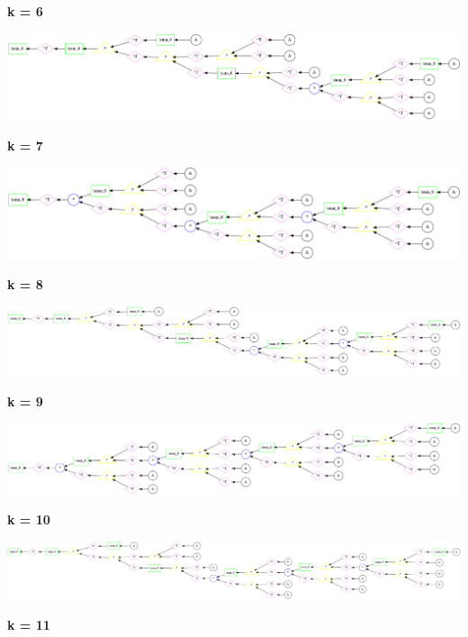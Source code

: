 {\bf k = 6}


\begin{center}
\includegraphics[width=0.45\linewidth]{trees/SumAmultA_6_horizontal_0.png}
\end{center}


{\bf k = 7}


\begin{center}
\includegraphics[width=0.45\linewidth]{trees/SumAmultA_7_horizontal_0.png}
\end{center}


{\bf k = 8}


\begin{center}
\includegraphics[width=0.45\linewidth]{trees/SumAmultA_8_horizontal_0.png}
\end{center}


{\bf k = 9}


\begin{center}
\includegraphics[width=0.45\linewidth]{trees/SumAmultA_9_horizontal_0.png}
\end{center}


{\bf k = 10}


\begin{center}
\includegraphics[width=0.45\linewidth]{trees/SumAmultA_10_horizontal_0.png}
\end{center}


{\bf k = 11}

